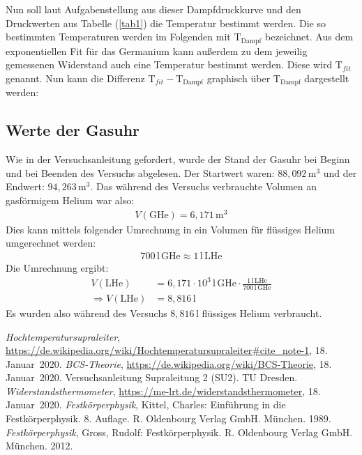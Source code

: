 \documentclass[german,  %
parskip=full,  %
]{scrartcl}
\begin{document}
\\\\\\\\\\\\\\
Nun soll laut Aufgabenstellung aus dieser Dampfdruckkurve und den Druckwerten aus Tabelle (\ref{tab1}) die Temperatur bestimmt werden. Die so bestimmten Temperaturen werden im Folgenden mit $\text{T}_{\text{Dampf}}$ bezeichnet. Aus dem exponentiellen Fit für das Germanium kann außerdem zu dem jeweilig gemessenen Widerstand auch eine Temperatur bestimmt werden. Diese wird $\text{T}_{fit}$ genannt. Nun kann die Differenz $\text{T}_{fit} - \text{T}_{\text{Dampf}}$ graphisch über 
$\text{T}_{\text{Dampf}}$ dargestellt werden:
%
%
%
%
%
%
%
%
%
%
%
%
%
%
%
%
%
%
%
%
%
%
%
%
%
%
%
%
%
%
%
\subsection{Werte der Gasuhr}
Wie in der Versuchsanleitung gefordert, wurde der Stand der Gasuhr bei Beginn und bei Beenden des Versuchs abgelesen. Der Startwert waren: $88,092 \, \text{m}^3$ und der Endwert: $94,263 \, \text{m}^3$. Das während des Versuchs verbrauchte Volumen an gasförmigem Helium war also: 
\begin{align*}
V(\text{GHe}) = 6,171 \, \text{m}^3
\end{align*}
Dies kann mittels folgender Umrechnung in ein Volumen für flüssiges Helium umgerechnet werden:
\begin{align*}
700 \, \text{l} \, \text{GHe} \approx 1 \, \text{l} \, \text{LHe}
\end{align*}
Die Umrechnung ergibt:
\begin{align*}
V(\text{LHe}) &= 6,171 \cdot 10^3 \, \text{l} \, \text{GHe} \cdot \frac{1 \, \text{l} \, \text{LHe}}{700 \, \text{l} \, \text{GHe}} \\
\Rightarrow V(\text{LHe}) &= 8,816 \, \text{l}
\end{align*}
Es wurden also während des Versuchs $8,816 \, \text{l}$ flüssiges Helium verbraucht.

\newpage
    \begin{thebibliography}{9}
    \emph{Hochtemperatursupraleiter},
    \url{https://de.wikipedia.org/wiki/Hochtemperatursupraleiter#cite_note-1},
    18.\,Januar~2020.
    \emph{BCS-Theorie},
    \url{https://de.wikipedia.org/wiki/BCS-Theorie},
    18.\,Januar~2020.
    Versuchsanleitung Supraleitung 2 (SU2). TU Dresden.
    \emph{Widerstandsthermometer},
    \url{https://me-lrt.de/widerstandsthermometer},
    18.\,Januar~2020.
    \emph{Festkörperphysik},
    Kittel, Charles: Einführung in die Festkörperphysik. 8. Auflage. R. Oldenbourg Verlag GmbH. München. 1989.
    \emph{Festkörperphysik},
    Gross, Rudolf: Festkörperphysik. R. Oldenbourg Verlag GmbH. München. 2012.

    \end{thebibliography}

\end{document}
